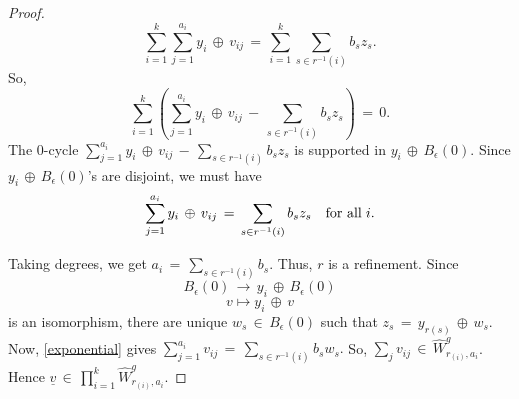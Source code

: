 \documentclass[12pt,reqno]{amsart}
\theoremstyle{definition}
\numberwithin{equation}{section}
\begin{document}
\begin{proof}
    \begin{equation}\label{sum}
        \sum_{i=1}^{k}\sum_{j=1}^{a_{i}} y_{i}\,\oplus\, v_{ij}\,=\, \sum_{i=1}^{k}\sum_{s\in r^{-1}(i)}b_{s}z_{s}.
    \end{equation}
    So, $$ \sum_{i=1}^k(\sum_{j=1}^{a_{i}} y_{i}\,\oplus\, v_{ij}\,-\, \sum_{s\in r^{-1}(i)}b_{s}z_{s})\,=\,0.$$
    The $0$-cycle $\sum_{j=1}^{a_{i}} y_{i}\,\oplus\, v_{ij}\,-\, \sum_{s\in r^{-1}(i)}b_{s}z_{s}$ is supported in $y_{i}\,\oplus\, B_{\epsilon}(0).$
    Since $ y_{i}\,\oplus\, B_{\epsilon}(0)$'s are disjoint, we must have 
    \begin{equation}\label{exponential}
\sum_{j=1}^{a_{i}}y_{i}\,\oplus\, v_{ij}\,=\, \sum_{s\in r^{-1}(i)}b_{s}z_{s}\quad \textnormal{for all} \hspace{3pt}i. 
\end{equation}

Taking degrees, we get $ a_{i}\,=\,\underset{s\in r^{-1}(i)}{\sum}b_{s}.$ Thus, $ r$ is a refinement. Since $$ B_{\epsilon}(0)\, \longrightarrow\, y_{i}\,\oplus\, B_{\epsilon}(0)$$
$$ v \longmapsto y_{i}\,\oplus\, v$$
is an isomorphism,  there are unique $ w_{s}\,\in\, B_{\epsilon}(0)$ such that $ z_{s}\,=\, y_{r(s)} \,\oplus\, w_{s}.$ Now, \eqref{exponential} gives $ \sum_{j=1}^{a_{i}} v_{ij}\,=\, \sum _{s\in r^{-1}(i)} b_{s}w_{s}.$ So, $ \sum_{j}v_{ij}\, \in\, \widehat{W}_{r_{(i)},a_{i}}^{g}$. Hence $ \underline{v}\, \in\, \prod_{i=1}^{k}\widehat{W}_{r_{(i)},a_{i}}^{g}$.
\end{proof}
\end{document}
